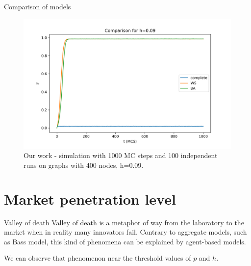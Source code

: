 \documentclass[10pt]{beamer}
\begin{document}
\begin{frame}{Comparison of models}
	\begin{figure}
		\includegraphics[width=\textwidth]{../results/images/comparison.png}
		\caption{Our work - simulation with 1000 MC steps and 100 independent runs on graphs with 400 nodes, h=0.09. }
	\end{figure}
\end{frame}

\section{Market penetration level}

\begin{frame}{Valley of death}
	Valley of death is a metaphor of way from the laboratory to the market when in reality many innovators fail. Contrary to aggregate models, such as Bass model, this kind of phenomena can be explained by agent-based models.
	
	We can observe that phenomenon near the threshold values of $p$ and $h$.
\end{frame}
\end{document}
